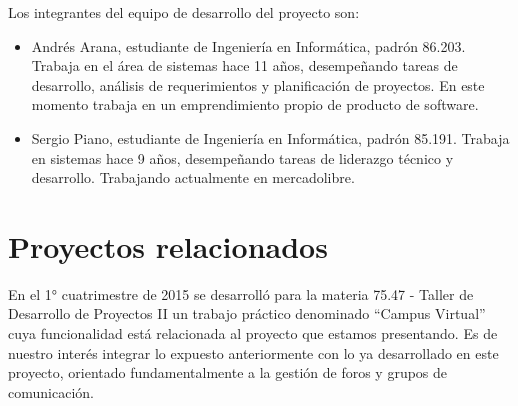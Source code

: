 \documentclass[a4paper,11pt]{article}
\begin{document}
Los integrantes del equipo de desarrollo del proyecto son:

\begin{itemize}
    \item Andrés Arana, estudiante de Ingeniería en Informática, padrón 86.203.
      Trabaja en el área de sistemas hace 11 años, desempeñando tareas de
      desarrollo, análisis de requerimientos y planificación de proyectos. En
      este momento trabaja en un emprendimiento propio de producto de software.

    \item Sergio Piano, estudiante de Ingeniería en Informática, padrón 85.191.
      Trabaja en sistemas hace 9 años, desempeñando tareas de liderazgo técnico
      y desarrollo. Trabajando actualmente en mercadolibre.
\end{itemize}

\section*{{\Large{}Proyectos relacionados}}

En el 1° cuatrimestre de 2015 se desarrolló para la materia 75.47 - Taller de
Desarrollo de Proyectos II un trabajo práctico denominado ``Campus Virtual''
cuya funcionalidad está relacionada al proyecto que estamos presentando. Es de
nuestro interés integrar lo expuesto anteriormente con lo ya desarrollado en
este proyecto, orientado fundamentalmente a la gestión de foros y grupos de
comunicación.
\end{document}
